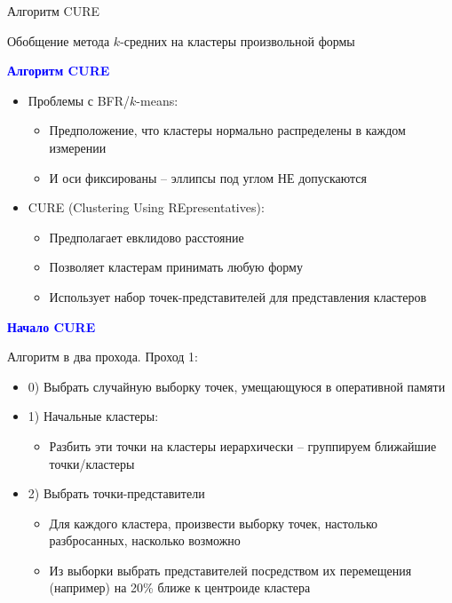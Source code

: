 \documentclass[landscape]{slides}
\begin{document}
\begin{normalsize}
\begin{slide}
Алгоритм CURE

Обобщение метода $k$-средних на кластеры произвольной формы
\end{slide}



\begin{slide}
\textbf{\textcolor{blue}{Алгоритм CURE}}

\begin{itemize}
\item Проблемы с BFR/$k$-means:
  \begin{itemize}
  \item Предположение, что кластеры нормально распределены в каждом измерении
  \item И оси фиксированы -- эллипсы под углом НЕ допускаются
  \end{itemize}
\item CURE (Clustering Using REpresentatives):
  \begin{itemize}
  \item Предполагает евклидово расстояние
  \item Позволяет кластерам принимать любую форму
  \item Использует набор точек-представителей для представления кластеров
  \end{itemize}
\end{itemize}
\end{slide}



\begin{slide}
\textbf{\textcolor{blue}{Начало CURE}}

Алгоритм в два прохода. Проход 1:

\begin{itemize}
\item 0) Выбрать случайную выборку точек, умещающуюся в оперативной памяти
\item 1) Начальные кластеры:
  \begin{itemize}
  \item Разбить эти точки на кластеры иерархически -- группируем ближайшие точки/кластеры
  \end{itemize}
\item 2) Выбрать точки-представители
  \begin{itemize}
  \item Для каждого кластера, произвести выборку точек, настолько разбросанных, насколько возможно
  \item Из выборки выбрать представителей посредством их перемещения (например) на 20\% ближе к центроиде кластера
  \end{itemize}
\end{itemize}
\end{slide}




\end{normalsize}
\end{document}
